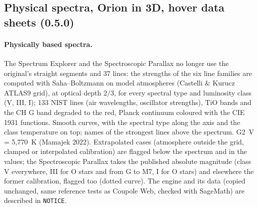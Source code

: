 \subsection{Physical spectra, Orion in 3D, hover data sheets (0.5.0)}\label{sec:orion}
\paragraph{Physically based spectra.} The Spectrum Explorer and the Spectroscopic Parallax no longer use the
original's straight segments and 37 lines: the strengths of the six line families are computed with Saha–Boltzmann on
model atmospheres (Castelli \& Kurucz ATLAS9 grid), at optical depth $2/3$, for every spectral type and luminosity
class (V, III, I); 133 NIST lines (air wavelengths, oscillator strengths), TiO bands and the CH G band degraded to the
red, Planck continuum coloured with the CIE 1931 functions. Smooth curves, with the spectral type along the axis and
the class temperature on top; names of the strongest lines above the spectrum. G2~V = 5,770~K (Mamajek 2022).
Extrapolated cases (atmosphere outside the grid, clamped or interpolated calibration) are flagged below the spectrum
and in the values; the Spectroscopic Parallax takes the published absolute magnitude (class V everywhere, III for O
stars and from G to M7, I for O stars) and elsewhere the former calibration, flagged too (dotted curve). The engine and
its data (copied unchanged, same reference tests as Coupole Web, checked with SageMath) are described in
\texttt{NOTICE}.


